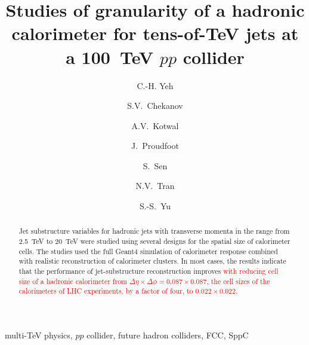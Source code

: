 \documentclass[final,1p,11pt]{elsarticle}
\begin{document}
\begin{frontmatter}

\title{
Studies of granularity of a hadronic calorimeter for tens-of-TeV jets  at a 100~TeV $pp$ collider 
}

\author[add3]{C.-H. Yeh}

\author[add1]{S.V.~Chekanov}

\author[addDuke]{A.V.~Kotwal}

\author[add1]{J.~Proudfoot}

\author[addDuke]{S.~Sen}

\author[add2]{N.V.~Tran}

\author[add3]{S.-S.~Yu}

\address[add3]{
Department of Physics and Center for High Energy and High Field Physics, 
National Central University, Chung-Li, Taoyuan City 32001, Taiwan
}

\address[add1]{
HEP Division, Argonne National Laboratory,
9700 S.~Cass Avenue,
Argonne, IL 60439, USA. 
}

\address[addDuke]{
Department of Physics, Duke University, USA
}

\address[add2]{
Fermi National Accelerator Laboratory
}




\begin{abstract}
Jet substructure variables for hadronic jets with transverse momenta in the range from 2.5~TeV to 20~TeV
were studied using several designs for the spatial size of calorimeter cells. The studies  used 
the full Geant4 simulation 
of calorimeter response combined with realistic reconstruction of calorimeter clusters.
In most cases, the results indicate that the performance of jet-substructure 
reconstruction improves \textcolor{red}{with reducing cell size of a hadronic calorimeter 
from $\Delta \eta \times \Delta \phi = 0.087\times0.087$,
the cell sizes of the calorimeters of LHC experiments, by a factor of four, to  $0.022\times0.022$.} 


\end{abstract}

\begin{keyword}
multi-TeV physics, $pp$ collider, future hadron colliders, FCC, SppC
\end{keyword}



\end{frontmatter}
\end{document}
